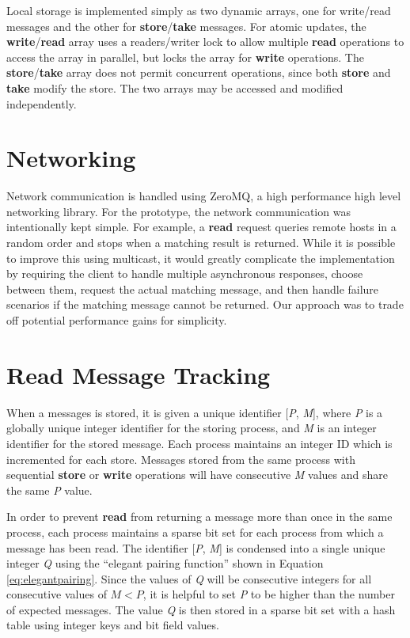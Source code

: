 Local storage is implemented simply as two dynamic arrays, one for write/read messages and the other for \textbf{store}/\textbf{take} messages. For atomic updates, the \textbf{write}/\textbf{read} array uses a readers/writer lock to allow multiple \textbf{read} operations to access the array in parallel, but locks the array for \textbf{write} operations. The \textbf{store}/\textbf{take} array does not permit concurrent operations, since both \textbf{store} and \textbf{take} modify the store. The two arrays may be accessed and modified independently.

\section{Networking}

Network communication is handled using ZeroMQ\cite{hintjens2013zeromq}, a high performance high level networking library. For the prototype, the network communication was intentionally kept simple. For example, a \textbf{read} request queries remote hosts in a random order and stops when a matching result is returned. While it is possible to improve this using multicast, it would greatly complicate the implementation by requiring the client to handle multiple asynchronous responses, choose between them, request the actual matching message, and then handle failure scenarios if the matching message cannot be returned. Our approach was to trade off potential performance gains for simplicity.

\section{Read Message Tracking}

When a messages is stored, it is given a unique identifier [\textit{P}, \textit{M}], where \textit{P} is a globally unique integer identifier for the storing process, and \textit{M} is an integer identifier for the stored message. Each process maintains an integer ID which is incremented for each store. Messages stored from the same process with sequential \textbf{store} or \textbf{write} operations will have consecutive \textit{M} values and share the same \textit{P} value.

In order to prevent \textbf{read} from returning a message more than once in the same process, each process maintains a sparse bit set for each process from which a message has been read. The identifier [\textit{P}, \textit{M}] is condensed into a single unique integer \textit{Q} using the ``elegant pairing function''\cite{szudzikelegant} shown in Equation \ref{eq:elegantpairing}. Since the values of \textit{Q} will be consecutive integers for all consecutive values of $M < P$, it is helpful to set \textit{P} to be higher than the number of expected messages. The value \textit{Q} is then stored in a sparse bit set with a hash table using integer keys and bit field values.

